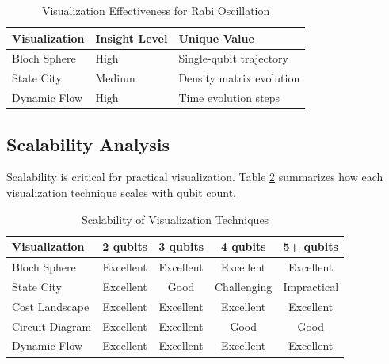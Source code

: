 \documentclass[12pt,a4paper]{article}
\begin{document}
\begin{table}[h!]
	\centering
	\caption{Visualization Effectiveness for Rabi Oscillation}
	\label{tab:rabi_visualization}
	\begin{tabular}{@{}lll@{}}
		\toprule
		\textbf{Visualization} & \textbf{Insight Level} & \textbf{Unique Value}    \\ \midrule
		Bloch Sphere           & High                   & Single-qubit trajectory  \\
		State City             & Medium                 & Density matrix evolution \\
		Dynamic Flow           & High                   & Time evolution steps     \\ \bottomrule
	\end{tabular}
\end{table}

\subsection{Scalability Analysis}

Scalability is critical for practical visualization. Table \ref{tab:scalability} summarizes how each visualization technique scales with qubit count.

\begin{table}[h!]
	\centering
	\caption{Scalability of Visualization Techniques}
	\label{tab:scalability}
	\begin{tabular}{@{}lcccc@{}}
		\toprule
		\textbf{Visualization} & \textbf{2 qubits} & \textbf{3 qubits} & \textbf{4 qubits} & \textbf{5+ qubits} \\ \midrule
		Bloch Sphere           & Excellent         & Excellent         & Excellent         & Excellent          \\
		State City             & Excellent         & Good              & Challenging       & Impractical        \\
		Cost Landscape         & Excellent         & Excellent         & Excellent         & Excellent          \\
		Circuit Diagram        & Excellent         & Excellent         & Good              & Good               \\
		Dynamic Flow           & Excellent         & Excellent         & Excellent         & Excellent          \\ \bottomrule
	\end{tabular}
\end{table}
\end{document}
